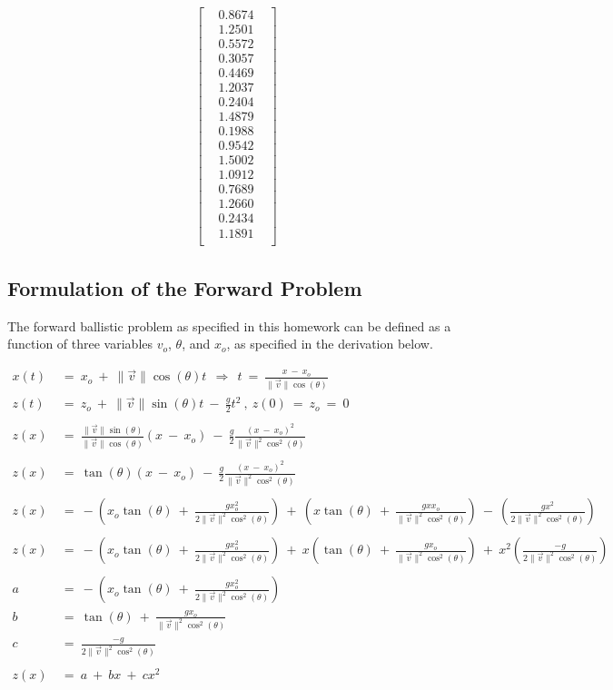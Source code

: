 \documentclass[12pt,runningheads]{article}
\begin{document}
\begin{align*}
\begin{bmatrix}
& 0.8674 & \\
& 1.2501 & \\
& 0.5572 & \\
& 0.3057 & \\
& 0.4469 & \\
& 1.2037 & \\
& 0.2404 & \\
& 1.4879 & \\
& 0.1988 & \\
& 0.9542 & \\
& 1.5002 & \\
& 1.0912 & \\
& 0.7689 & \\
& 1.2660 & \\
& 0.2434 & \\
& 1.1891 & \\
\end{bmatrix}
\end{align*}
\pagebreak

\subsection*{Formulation of the Forward Problem}
The forward ballistic problem as specified in this homework can be defined as a function of three variables $v_{o}$, $\theta$, and $x_{o}$, as specified in the derivation below.

\begin{align*}
x(t)\ &=\ x_{o}\ +\ \|\vec{v}\|\cos(\theta)t\ \ \Rightarrow \ \ t\ =\ \frac{x\ -\ x_{o}}{\|\vec{v}\|\cos(\theta)}\\
z(t)\ &=\ z_{o}\ +\ \|\vec{v}\|\sin(\theta)t\ -\ \frac{g}{2}t^{2}\ ,\ z(0)\ =\ z_{o}\ =\ 0\\
\\
z(x)\ &=\ \frac{\|\vec{v}\|\sin(\theta)}{\|\vec{v}\|\cos(\theta)}(x\ -\ x_{o})\ -\  \frac{g}{2}\frac{(x\ -\ x_{o})^2}{\|\vec{v}\|^2\cos^2(\theta)}\\
\\
z(x)\ &=\ \tan(\theta)(x\ -\ x_{o})\ -\ \frac{g}{2}\frac{(x\ -\ x_{o})^2}{\|\vec{v}\|^2\cos^2(\theta)}\\
\\
z(x)\ &=\ -(x_{o}\tan(\theta)\ +\ \frac{gx_{o}^2}{2\|\vec{v}\|^2\cos^2(\theta)})\ +\ (x\tan(\theta)\ +\ \frac{gxx_{o}}{\|\vec{v}\|^2\cos^2(\theta)})\ -\ (\frac{gx^2}{2\|\vec{v}\|^2\cos^2(\theta)})\\
\\
z(x)\ &=\ -(x_{o}\tan(\theta)\ +\ \frac{gx_{o}^2}{2\|\vec{v}\|^2\cos^2(\theta)})\ +\ x(\tan(\theta)\ +\ \frac{gx_{o}}{\|\vec{v}\|^2\cos^2(\theta)})\ +\ x^{2}(\frac{-g}{2\|\vec{v}\|^2\cos^2(\theta)})\\
\\
a\ &=\ -(x_{o}\tan(\theta)\ +\ \frac{gx_{o}^2}{2\|\vec{v}\|^2\cos^2(\theta)})\\
b\ &=\ \tan(\theta)\ +\ \frac{gx_{o}}{\|\vec{v}\|^2\cos^2(\theta)}\\
c\ &=\ \frac{-g}{2\|\vec{v}\|^2\cos^2(\theta)}\\ \\
z(x)\ &=\ a\ +\ bx\ +\ cx^{2}\\
\end{align*}
\end{document}
